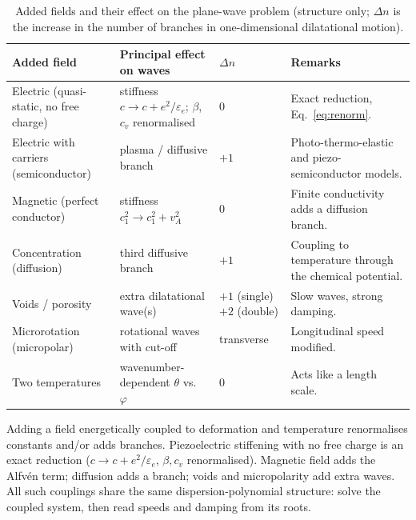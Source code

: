 \begin{table}[t]\centering\small
\caption{Added fields and their effect on the plane-wave problem (structure only; $\Delta n$ is the increase in the number of branches in one-dimensional dilatational motion).}\label{tab:couplings}
\begin{tabularx}{\textwidth}{@{}p{3.1cm}p{3.2cm}p{1.9cm}X@{}}\toprule
Added field & Principal effect on waves & $\Delta n$ & Remarks\\\midrule
Electric (quasi-static, no free charge) & stiffness $c\to c+e^2/\varepsilon_e$; $\beta$, $c_v$ renormalised & 0 & Exact reduction, Eq.~\eqref{eq:renorm}.\\
Electric with carriers (semiconductor) & plasma / diffusive branch & $+1$ & Photo-thermo-elastic and piezo-semiconductor models.\\
Magnetic (perfect conductor) & stiffness $c_1^2\to c_1^2+v_A^2$ & 0 & Finite conductivity adds a diffusion branch.\\
Concentration (diffusion) & third diffusive branch & $+1$ & Coupling to temperature through the chemical potential.\\
Voids / porosity & extra dilatational wave(s) & $+1$ (single) $+2$ (double) & Slow waves, strong damping.\\
Microrotation (micropolar) & rotational waves with cut-off & transverse & Longitudinal speed modified.\\
Two temperatures & wavenumber-dependent $\theta$ vs.\ $\varphi$ & 0 & Acts like a length scale.\\\bottomrule
\end{tabularx}
\end{table}

\begin{summarybox}[Summary]
Adding a field energetically coupled to deformation and temperature renormalises constants and/or adds branches. Piezoelectric stiffening with no free charge is an exact reduction ($c\to c+e^2/\varepsilon_e$, $\beta,c_v$ renormalised). Magnetic field adds the Alfv\'en term; diffusion adds a branch; voids and micropolarity add extra waves. All such couplings share the same dispersion-polynomial structure: solve the coupled system, then read speeds and damping from its roots.
\end{summarybox}

